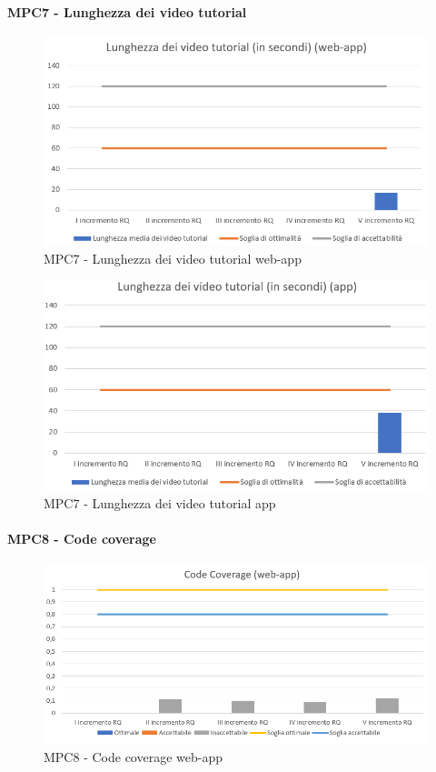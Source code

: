   \clearpage
  \paragraph{MPC7 - Lunghezza dei video tutorial}
  \begin{figure}[h!]
    \centering
      \includegraphics[scale=1]{Immagini/lunghVideoTut WA.PNG}
    \caption{MPC7 - Lunghezza dei video tutorial web-app}
  \end{figure}

  \begin{figure}[h!]
    \centering
      \includegraphics[scale=1]{Immagini/lunghVideoTut APP.PNG}
    \caption{MPC7 - Lunghezza dei video tutorial app}
  \end{figure}



  \clearpage
  \paragraph{MPC8 - Code coverage}
  \begin{figure}[h!]
    \centering
      \includegraphics[scale=1]{Immagini/CodeCov WA.PNG}
    \caption{MPC8 - Code coverage web-app}
  \end{figure}

